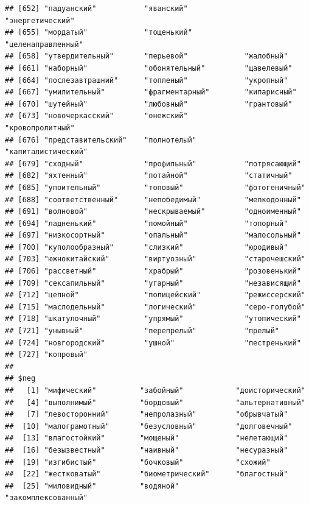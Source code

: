 \documentclass[11pt]{article}\usepackage[]{graphicx}\usepackage[]{color}
\makeatletter
\newenvironment{kframe}{%
 \def\at@end@of@kframe{}%
 \ifinner\ifhmode%
  \def\at@end@of@kframe{\end{minipage}}%
  \begin{minipage}{\columnwidth}%
 \fi\fi%
 \def\FrameCommand##1{\hskip\@totalleftmargin \hskip-\fboxsep
 \colorbox{shadecolor}{##1}\hskip-\fboxsep
     \hskip-\linewidth \hskip-\@totalleftmargin \hskip\columnwidth}%
 \MakeFramed {\advance\hsize-\width
   \@totalleftmargin\z@ \linewidth\hsize
   \@setminipage}}%
 {\par\unskip\endMakeFramed%
 \at@end@of@kframe}
\newenvironment{knitrout}{}{} %
\makeatother
\begin{document}
\begin{knitrout}
\begin{kframe}
\begin{verbatim}
## [652] "падуанский"           "яванский"             "энергетический"      
## [655] "мордатый"             "тощенький"            "целенаправленный"    
## [658] "утвердительный"       "перьевой"             "жалобный"            
## [661] "наборный"             "обонятельный"         "щавелевый"           
## [664] "послезавтрашний"      "топленый"             "укропный"            
## [667] "умилительный"         "фрагментарный"        "кипарисный"          
## [670] "шутейный"             "любовный"             "грантовый"           
## [673] "новочеркасский"       "онежский"             "кровопролитный"      
## [676] "представительский"    "полнотелый"           "капиталистический"   
## [679] "сходный"              "профильный"           "потрясающий"         
## [682] "яхтенный"             "потайной"             "статичный"           
## [685] "упоительный"          "топовый"              "фотогеничный"        
## [688] "соответственный"      "непобедимый"          "мелкодонный"         
## [691] "волновой"             "нескрываемый"         "одноименный"         
## [694] "ладненький"           "помойный"             "топорный"            
## [697] "низкосортный"         "опальный"             "малосольный"         
## [700] "куполообразный"       "слизкий"              "юродивый"            
## [703] "южнокитайский"        "виртуозный"           "старочешский"        
## [706] "рассветный"           "храбрый"              "розовенький"         
## [709] "сексапильный"         "угарный"              "независящий"         
## [712] "цепной"               "полицейский"          "режиссерский"        
## [715] "маслодельный"         "логический"           "серо-голубой"        
## [718] "шкатулочный"          "упрямый"              "утопический"         
## [721] "унывный"              "перепрелый"           "прелый"              
## [724] "новгородский"         "ушной"                "пестренький"         
## [727] "копровый"            
## 
## $neg
##   [1] "мифический"          "забойный"            "доисторический"     
##   [4] "выполнимый"          "бордовый"            "альтернативный"     
##   [7] "левосторонний"       "непролазный"         "обрывчатый"         
##  [10] "малограмотный"       "безусловный"         "долговечный"        
##  [13] "влагостойкий"        "мощеный"             "нелетающий"         
##  [16] "безызвестный"        "наивный"             "несуразный"         
##  [19] "изгибистый"          "бочковый"            "схожий"             
##  [22] "жестковатый"         "биометрический"      "благостный"         
##  [25] "миловидный"          "водяной"             "закомплексованный"  

\end{verbatim}
\end{kframe}
\end{knitrout}
\end{document}
